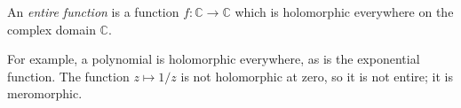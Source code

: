 \documentclass{article}
\begin{document}
An \emph{entire function} is a function $f: \mathbb{C} \longrightarrow \mathbb{C}$ which is holomorphic everywhere on the complex domain $\mathbb{C}$.

For example, a polynomial is holomorphic everywhere, as is the exponential function.  The function $z\mapsto 1/z$ is not holomorphic at zero, so it is not entire; it is meromorphic.
\end{document}
